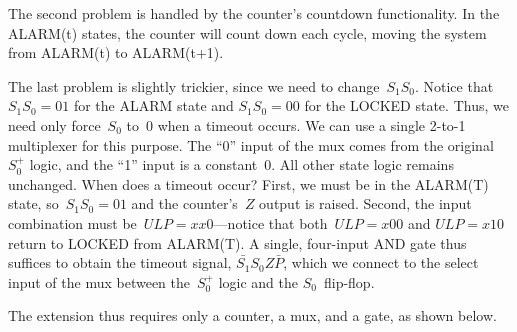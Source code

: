 The second problem is handled by the counter's countdown functionality.
In the ALARM(t) states, the counter will count down each cycle, moving
the system from ALARM(t) to ALARM(t+1).

The last problem is slightly trickier, since we need to change~$S_1S_0$.
Notice that $S_1S_0=01$ for the ALARM state and $S_1S_0=00$ for the LOCKED
state.  Thus, we need only force~$S_0$ to~0 when a timeout occurs.
We can use a single \mbox{2-to-1} multiplexer for this purpose.  The
``0'' input of the mux comes from the original $S_0^+$ logic, and the
``1'' input is a constant~0.  All other state logic remains unchanged.  
When does a timeout occur? 
%
First, we must be in the ALARM(T) state, so~$S_1S_0=01$ and the 
counter's~$Z$ output is raised.  Second, the input combination must
be~$ULP=xx0$---notice that both~$ULP=x00$ and $ULP=x10$ return to 
LOCKED from ALARM(T).  A single, four-input AND gate thus suffices to
obtain the timeout signal, $\bar{S_1}S_0Z\bar{P}$, which we connect 
to the select input of the mux between the~$S_0^+$ logic and the
$S_0$~flip-flop.

The extension thus requires only a counter, a mux, and a gate, as shown below.\\

\centerline{}

\vfill

\pagebreak

